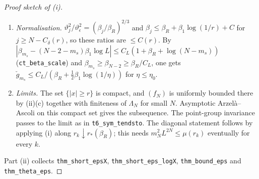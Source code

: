 \documentclass[11pt]{amsart}
\theoremstyle{definition}
\theoremstyle{remark}
\numberwithin{equation}{section}
\begin{document}
\begin{proof}[Proof sketch of (i)]
\begin{enumerate}
\begin{itemize}
$\Theta_b=e^c(81/56)^{N_h-j_Y}\le e^c\Theta(r)$. This holds if $\check g_{j_Y}\le C_L/\beta_R\le c\,\Theta(r)^{-2}$, i.e.\ if
$1/\beta_R\le g(r)$.
\item The mass windows $\mathtt{hmAB}$, $\mathtt{hmAa}$ read $C\,\bar m\,m^2L^{2N}\le1$, where
$\bar m=\max(1,2\Lambda_1)^{C_\delta}m_0$ and $m_0\ge(2\iota(v_T,w_T)A)^{(L+18)^2}$, with
$\iota(v,w)=e^{3/2+v}(2+w)$, $v_T\ge1+\Theta_b$ and $w_T\ge e^{L^2C_w(2\bar k)^2}-1$, $\bar k\asymp\Theta_b$. These hold
if $m^2L^{2N}\le\mu(r)$.
\end{itemize}
The remaining conditions are those of Theorem~\ref{thm:multiscale}.
\item \emph{Normalisation.} $\vartheta_j^2/\vartheta_\epsilon^2=(\beta_j/\beta_R)^{2/3}$ and
$\beta_j\le\beta_R+\beta_1\log(1/r)+C$ for $j\ge N-C_\delta(r)$, so these ratios are $\le C(r)$. By
$|\beta_{m_s}-(N-2-m_s)\beta_1\log L|\le C_L(1+\beta_R+\log(N-m_s))$ (\texttt{ct\_beta\_scale}) and
$\beta_{m_s}\ge\beta_{N-2}\ge\beta_R/C_L$, one gets $\check g_{m_s}\le C_L/(\beta_R+\frac12\beta_1\log(1/\eta))$ for
$\eta\le\eta_0$.
\item \emph{Limits.} The set $\{|x|\ge r\}$ is compact, and $(f_N)$ is uniformly bounded there by (ii)(c) together with
finiteness of $\Lambda_N$ for small $N$. Asymptotic Arzel\`a--Ascoli on this compact set gives the subsequence. The
point-group invariance passes to the limit as in \texttt{t6\_sym\_tendsto}. The diagonal statement follows by applying
(i) along $r_k\downarrow r_*(\beta_R)$; this needs $m_N^2L^{2N}\le\mu(r_k)$ eventually for every $k$.
\end{enumerate}
Part (ii) collects \texttt{thm\_short\_epsX}, \texttt{thm\_short\_eps\_logX}, \texttt{thm\_bound\_eps} and
\texttt{thm\_theta\_eps}.
\end{proof}
\end{document}

